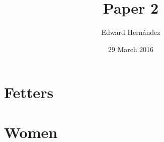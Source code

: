 \documentclass[man,12pt,natbib]{apa6}
\begin{document}
\title{Paper 2}
\author{Edward Hern\'{a}ndez}
\date{29 March 2016}
\maketitle

\section{Fetters}




\nocite{Thoreau12, Melville12, Hawthorne12b}

\clearpage

\section{Women}
\end{document}
